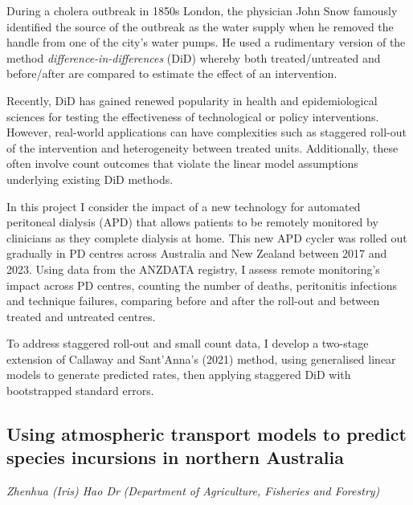 \documentclass[
]{scrreprt}
\begin{document}
During a cholera outbreak in 1850s London, the physician John Snow
famously identified the source of the outbreak as the water supply when
he removed the handle from one of the city's water pumps. He used a
rudimentary version of the method \emph{difference-in-differences} (DiD)
whereby both treated/untreated and before/after are compared to estimate
the effect of an intervention.

Recently, DiD has gained renewed popularity in health and
epidemiological sciences for testing the effectiveness of technological
or policy interventions. However, real-world applications can have
complexities such as staggered roll-out of the intervention and
heterogeneity between treated units. Additionally, these often involve
count outcomes that violate the linear model assumptions underlying
existing DiD methods.

In this project I consider the impact of a new technology for automated
peritoneal dialysis (APD) that allows patients to be remotely monitored
by clinicians as they complete dialysis at home. This new APD cycler was
rolled out gradually in PD centres across Australia and New Zealand
between 2017 and 2023. Using data from the ANZDATA registry, I assess
remote monitoring's impact across PD centres, counting the number of
deaths, peritonitis infections and technique failures, comparing before
and after the roll-out and between treated and untreated centres.

To address staggered roll-out and small count data, I develop a
two-stage extension of Callaway and Sant'Anna's (2021) method, using
generalised linear models to generate predicted rates, then applying
staggered DiD with bootstrapped standard errors.

\subsection{Using atmospheric transport models to predict species
incursions in northern
Australia}\label{using-atmospheric-transport-models-to-predict-species-incursions-in-northern-australia}

\emph{Zhenhua (Iris) Hao Dr}
\emph{(Department of Agriculture, Fisheries and Forestry)}

\setlength{\parskip}{0.5em}
\end{document}
